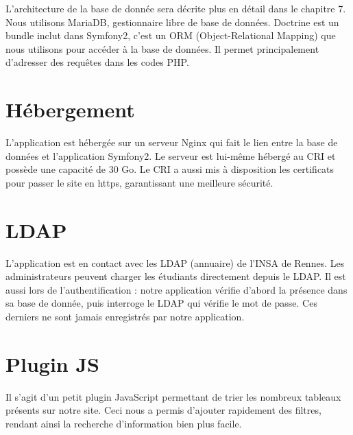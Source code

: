L'architecture de la base de donnée sera décrite plus en détail dans le chapitre 7. 
Nous utilisons MariaDB, gestionnaire libre de base de données.
\bigbreak
Doctrine est un bundle inclut dans Symfony2, c'est un ORM (Object-Relational Mapping) que nous utilisons pour accéder à la base de données. Il permet principalement d'adresser des requêtes dans les codes PHP.

\section{Hébergement}

L'application est hébergée sur un serveur Nginx qui fait le lien entre la base de données et l'application Symfony2. Le serveur est lui-même hébergé au CRI et possède une capacité de 30 Go. Le CRI a aussi mis à disposition les certificats pour passer le site en https, garantissant une meilleure sécurité.

\section{LDAP}

L'application est en contact avec les LDAP (annuaire) de l'INSA de Rennes.
Les administrateurs peuvent charger les étudiants directement depuis le LDAP. Il est aussi lors de l'authentification : notre application vérifie d'abord la présence dans sa base de donnée, puis interroge le LDAP qui vérifie le mot de passe. Ces derniers ne sont jamais enregistrés par notre application. 

\section{Plugin JS}

Il s'agit d'un petit plugin JavaScript permettant de trier les nombreux tableaux présents sur notre site. Ceci nous a permis d'ajouter rapidement des filtres, rendant ainsi la recherche d'information bien plus facile.